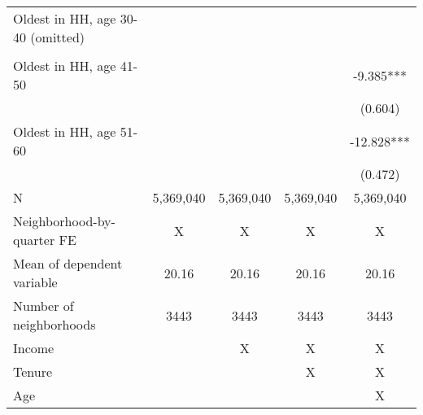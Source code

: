 \begin{tabular}{lcccc}
 
Oldest in HH, age 30-40 (omitted) &  &  &  & \\ 
 &  &  &  & \\ 

 
Oldest in HH, age 41-50 &  &  &  & -9.385*** \\ 
 &  &  &  & (0.604) \\ 
Oldest in HH, age 51-60 &  &  &  & -12.828*** \\ 
 &  &  &  & (0.472) \\ 
\midrule
N & 5,369,040 & 5,369,040 & 5,369,040 & 5,369,040 \\ 
Neighborhood-by-quarter FE & X & X & X & X \\ 
Mean of dependent variable & 20.16 & 20.16 & 20.16 & 20.16 \\ 
Number of neighborhoods & 3443 & 3443 & 3443 & 3443 \\ 
Income &  & X & X & X \\ 
Tenure &  &  & X & X \\ 
Age &  &  &  & X \\ 
\bottomrule
\end{tabular}